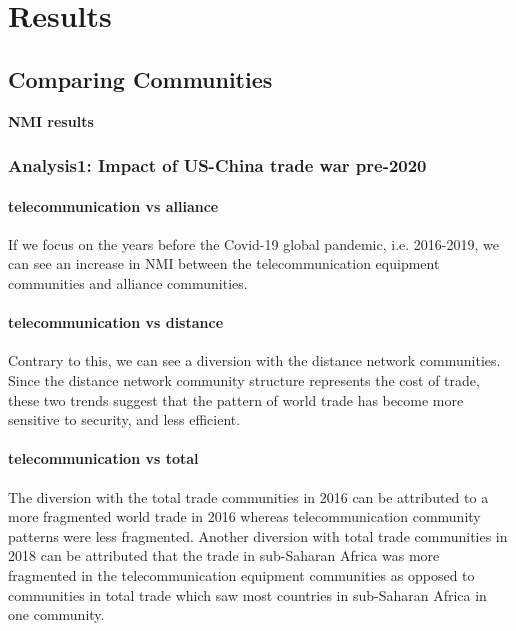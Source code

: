 \documentclass[a4paper, 12pt]{article}
\begin{document}
\newpage

\section{Results}
\subsection{Comparing Communities}
\textbf{NMI results}
\subsubsection{Analysis1: Impact of US-China trade war pre-2020}
\paragraph{telecommunication vs alliance}
If we focus on the years before the Covid-19 global pandemic, i.e. 2016-2019, we can see an increase in NMI between the telecommunication equipment communities and alliance communities.
\paragraph{telecommunication vs distance}
Contrary to this, we can see a diversion with the distance network communities.
Since the distance network community structure represents the cost of trade, these two trends suggest that the pattern of world trade has become more sensitive to security, and less efficient.
\paragraph{telecommunication vs total}
The diversion with the total trade communities in 2016 can be attributed to a more fragmented world trade in 2016 whereas telecommunication community patterns were less fragmented.
Another diversion with total trade communities in 2018 can be attributed that the trade in sub-Saharan Africa was more fragmented in the telecommunication equipment communities as opposed to communities in total trade which saw most countries in sub-Saharan Africa in one community.
\end{document}

